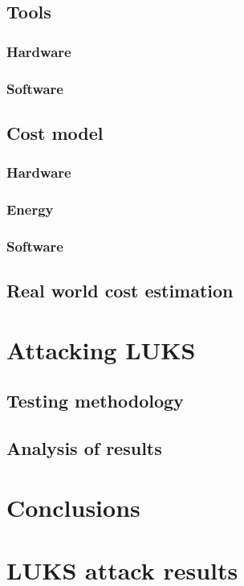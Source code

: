 \documentclass[nolof]{fithesis3}
\begin{document}
\section{Tools}

\subsection{Hardware}

\subsection{Software}

\section{Cost model}

\subsection{Hardware}

\subsection{Energy}

\subsection{Software}

\section{Real world cost estimation}

\chapter{Attacking LUKS}

\section{Testing methodology}


\section{Analysis of results}

\chapter{Conclusions}

\printbibliography

\appendix
\chapter{LUKS attack results}
\end{document}
